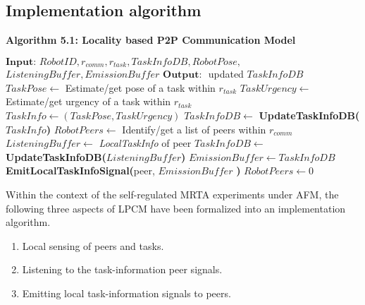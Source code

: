 \subsection{Implementation algorithm}

\textbf{\small Algorithm 5.1: Locality based P2P Communication Model}
\vspace{-3mm}
\newline
\HRule
\begin{algorithmic}[1]
\label{alg:lpcm}
\State $\textbf{Input: } RobotID, r_{comm}, r_{task}, TaskInfoDB, RobotPose,$\\ \hspace*{1cm}$ListeningBuffer, EmissionBuffer$
\State $\textbf{Output: }$ updated $TaskInfoDB$
\State {}
\State $ TaskPose \gets $ Estimate/get pose of a task within $r_{task}$
\State $ TaskUrgency \gets $ Estimate/get urgency of a task within $r_{task}$
\State $ TaskInfo \gets (TaskPose, TaskUrgency) $ 
\State $TaskInfoDB \gets$ \textbf{UpdateTaskInfoDB(}$TaskInfo$\textbf{)}
\State {}
\State $ RobotPeers \gets $ Identify/get a list of peers within $r_{comm}$
\State $ListeningBuffer \gets $ \textit{\textit{LocalTaskInfo}} of peer
\State $TaskInfoDB \gets$ \textbf{UpdateTaskInfoDB(}$ListeningBuffer$\textbf{)}
\EndIf
\EndFor
\State {}
\State $ EmissionBuffer \gets TaskInfoDB$
\State \textbf{EmitLocalTaskInfoSignal(}peer, $EmissionBuffer$ \textbf{) }
\EndFor
\State $RobotPeers \gets 0$
\end{algorithmic}
Within the context of the self-regulated MRTA experiments under AFM,  the following three aspects of LPCM  have been formalized into an implementation algorithm. 
\begin{enumerate}
\item Local sensing of peers and tasks.
\item Listening to the task-information peer signals.
\item Emitting local task-information signals to peers.
\end{enumerate}
